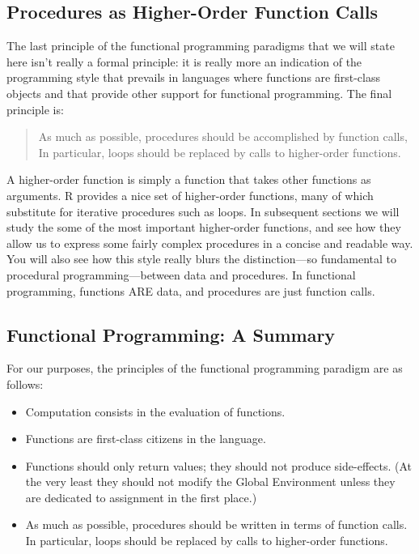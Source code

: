 \documentclass[]{book}
\providecommand{\tightlist}{%
  \setlength{\itemsep}{0pt}\setlength{\parskip}{0pt}}
\theoremstyle{definition}
\theoremstyle{definition}
\theoremstyle{definition}
\theoremstyle{remark}
\begin{document}
{\subsection{Procedures as Higher-Order Function
Calls}\label{procedures-as-higher-order-function-calls}

The last principle of the functional programming paradigms that we will
state here isn't really a formal principle: it is really more an
indication of the programming style that prevails in languages where
functions are first-class objects and that provide other support for
functional programming. The final principle is:

\begin{quote}
As much as possible, procedures should be accomplished by function
calls, In particular, loops should be replaced by calls to higher-order
functions.
\end{quote}

A higher-order function is simply a function that takes other functions
as arguments. R provides a nice set of
higher-order functions, many of which substitute for iterative
procedures such as loops. In subsequent sections we will study the some
of the most important higher-order functions, and see how they allow us
to express some fairly complex procedures in a concise and readable way.
You will also see how this style really blurs the distinction---so
fundamental to procedural programming---between data and procedures. In
functional programming, functions ARE data, and procedures are just
function calls.

\subsection{Functional Programming: A
Summary}\label{functional-programming-a-summary}

For our purposes, the principles of the functional programming paradigm
are as follows:

\begin{itemize}
\tightlist
\item
  Computation consists in the evaluation of functions.
\item
  Functions are first-class citizens in the language.
\item
  Functions should only return values; they should not produce
  side-effects. (At the very least they should not modify the Global
  Environment unless they are dedicated to assignment in the first
  place.)
\item
  As much as possible, procedures should be written in terms of function
  calls. In particular, loops should be replaced by calls to
  higher-order functions.
\end{itemize}

}
\end{document}
